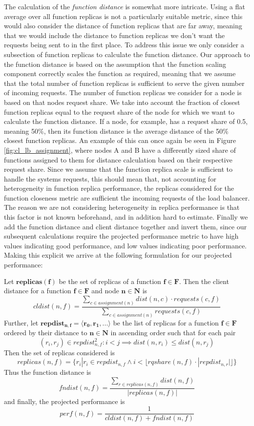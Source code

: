 \documentclass[draft,final]{vutinfth} %
\begin{document}
The calculation of the \textit{function distance} is somewhat more intricate.
Using a flat average over all function replicas is not a particularly suitable metric, since this would also consider the distance of function replicas that are far away, meaning that we would include the distance to function replicas we don't want the requests being sent to in the first place.
To address this issue we only consider a subsection of function replicas to calculate the function distance.
Our approach to the function distance is based on the assumption that the function scaling component correctly scales the function as required, meaning that we assume that the total number of function replicas is sufficient to serve the given number of incoming requests.
The number of function replicas we consider for a node is based on that nodes request share. We take into account the fraction of closest function replicas equal to the request share of the node for which we want to calculate the function distance.
If a node, for example, has a request share of 0.5, meaning 50\%, then its function distance is the average distance of the 50\% closest function replicas.
An example of this can once again be seen in Figure \ref{fig:cl_lb_assignment}, where nodes A and B have a differently sized share of functions assigned to them for distance calculation based on their respective request share.
Since we assume that the function replica scale is sufficient to handle the systems requests, this should mean that, not accounting for heterogeneity in function replica performance, the replicas considered for the function closeness metric are sufficient the incoming requests of the load balancer.
The reason we are not considering heterogeneity in replica performance is that this factor is not known beforehand, and in addition hard to estimate.
Finally we add the function distance and client distance together and invert them, since our subsequent calculations require the projected performance metric to have high values indicating good performance, and low values indicating poor performance.
Making this explicit we arrive at the following formulation for our projected performance:

Let $\mathbf{replicas(f)}$ be the set of replicas of a function $\mathbf{f \in F}$.
Then the client distance for a function $\mathbf{f \in F}$ and node $\mathbf{n \in N}$ is
\[cldist(n,f) = \frac{\sum_{c \in assignment(n)}dist(n,c) \cdot requests(c,f)}{\sum_{c \in assignment(n)}requests(c,f)} \]
Further, let $\mathbf{repdist_{n,f} = \langle r_{0}, r_{1}, ... \rangle}$ be the list of replicas for a function $\mathbf{f \in F}$ ordered by their distance to $\mathbf{n \in N}$ in ascending order such that for each pair 
\[(r_{i},r_{j}) \in repdist_{n,f}^{2}: i < j \implies dist(n, r_{i}) \leq dist(n, r_{j})\]
Then the set of replicas considered is
\[replicas(n,f) = \{r_{i} | r_{i} \in repdist_{n,f} \land i < \lfloor rqshare(n,f) \cdot |repdist_{n,r}| \rfloor\}\]
Thus the function distance is
\[fndist(n,f) = \frac{\sum_{r \in replicas(n,f)}dist(n,f)}{|replicas(n,f)|} \]
and finally, the projected performance is
\[perf(n,f) = \frac{1}{cldist(n,f) + fndist(n,f)} \]
\end{document}
